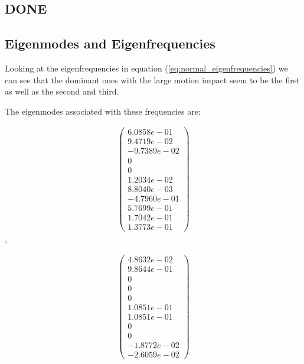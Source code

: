 \subsection{DONE}
\subsection{Eigenmodes and Eigenfrequencies}

Looking at the eigenfrequencies in equation (\ref{eq:normal_eigenfrequencies}) we can see that the dominant ones with the large motion impact seem to be the first as well as the second and third.

The eigenmodes associated with these frequencies are:

\begin{equation}
    \begin{split}
        \begin{pmatrix}
            6.0858e-01\\
            9.4719e-02\\
            -9.7389e-02\\
                        0\\
                        0\\
            1.2034e-02\\
            8.8040e-03\\
            -4.7960e-01\\
            5.7699e-01\\
            1.7042e-01\\
            1.3773e-01
        \end{pmatrix}
    \end{split}
\end{equation},

\begin{equation}
    \begin{split}
        \begin{pmatrix}
            4.8632e-02\\
            9.8644e-01\\
                    0\\
                    0\\
                    0\\
            1.0851e-01\\
            1.0851e-01\\
                    0\\
                    0\\
            -1.8772e-02\\
            -2.6059e-02
        \end{pmatrix}
    \end{split}
\end{equation}


